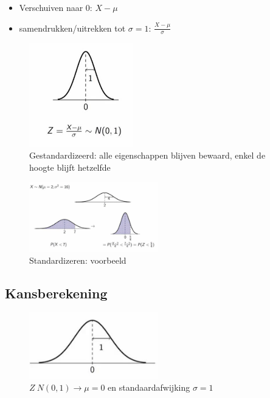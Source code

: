 \documentclass{article}
\begin{document}
\begin{itemize}
    \item Verschuiven naar $0$: $X - \mu$
    \item samendrukken/uitrekken tot $\sigma = 1$: $\frac{X - \mu}{\sigma}$
\end{itemize}


\begin{figure}[H]
    \centering
    \includegraphics[width=0.4\textwidth]{gestandardizeerd.png}
    \caption{Gestandardizeerd: alle eigenschappen blijven bewaard, enkel de hoogte blijft hetzelfde}
\end{figure}


\begin{figure}[H]
    \centering
    \includegraphics[width=0.5\textwidth]{standardizering-voorbeeld.png}
    \caption{Standardizeren: voorbeeld}
\end{figure}

\subsection{Kansberekening}

\begin{figure}[H]
    \centering
    \includegraphics[width=0.5\textwidth]{normaalverdeling-kansen.png}
    \caption{$Z ~ N(0, 1) \rightarrow \mu = 0$ en standaardafwijking $\sigma = 1$}
\end{figure}
\end{document}
